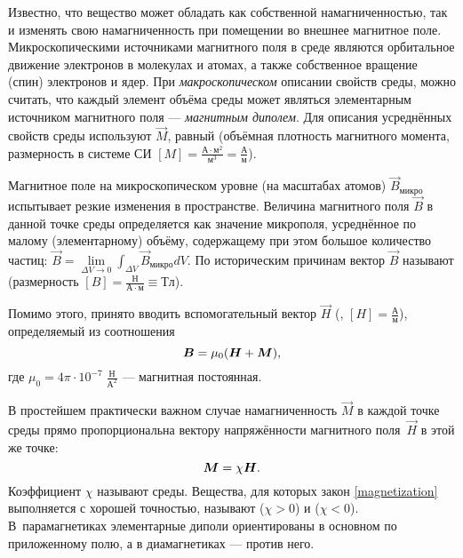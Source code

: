
Известно, что вещество может обладать как собственной намагниченностью, 
так и изменять свою намагниченность при помещении во внешнее магнитное поле.
Микроскопическими источниками магнитного поля в среде являются
орбитальное движение электронов в молекулах и атомах, а также собственное 
вращение (спин) электронов и ядер.
При \emph{макроскопическом} описании свойств среды, можно считать,
что каждый элемент объёма среды может являться элементарным источником
магнитного поля --- \emph{магнитным диполем}. Для описания усреднённых
свойств среды используют  $\vec{M}$, равный
(объёмная плотность магнитного момента, размерность в 
системе СИ $[M]=\frac{А\cdot м^2}{м^3}=\frac{А}{м}$).

Магнитное поле на микроскопическом уровне (на масштабах атомов) 
$\vec{B}_{\text{микро}}$ испытывает резкие изменения в пространстве.
Величина магнитного поля $\vec{B}$ в данной точке среды определяется как
значение микрополя, усреднённое по малому (элементарному) объёму, 
содержащему при этом большое количество частиц: 
$\vec{B}=\lim\limits_{\Delta V\to 0}\int_{\Delta V} \vec{B}_{микро}dV$.
По историческим причинам вектор $\vec{B}$ 
называют  
(размерность $[B] = \frac{Н}{А\cdot м}\equiv  Тл$).

Помимо этого, принято вводить вспомогательный вектор $\vec{H}$
(, $[H]=\frac{А}{м}$), определяемый 
из соотношения
\begin{equation}
    \eqmark{fieldB}
    \vec{B} = \mu_0(\vec{H} + \vec{M}),
\end{equation}
где $\mu_0=4\pi \cdot 10^{-7}\;\frac{Н}{А^2}$ --- магнитная постоянная.

В простейшем практически важном случае намагниченность $\vec{M}$ в каждой
точке среды прямо пропорциональна вектору напряжённости магнитного
поля~$\vec{H}$ в этой же точке:
\begin{equation}
    \eqmark{magnetization}
    \vec{M} = \chi\vec{H}.
\end{equation}
Коэффициент $\chi$ называют  среды.
Вещества, для которых закон \eqref{magnetization} выполняется
с хорошей точностью, называют  ($\chi > 0$) и
 ($\chi < 0$).
В~парамагнетиках элементарные диполи
ориентированы в основном по приложенному полю,
а в диамагнетиках --- против него.

